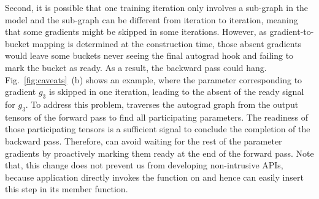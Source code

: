 Second, it is possible that one training iteration only involves a sub-graph in the model and the sub-graph can be different from iteration to iteration, meaning that some gradients might be skipped in some iterations. However, as gradient-to-bucket mapping is determined at the construction time, those absent gradients would leave some buckets never seeing the final autograd hook and failing to mark the bucket as ready. As a result, the backward pass could hang. 
Fig.~\ref{fig:caveats}~(b) shows an example, where the parameter corresponding to gradient $g_3$ is skipped in one iteration, leading to the absent of the ready signal for $g_3$.
%
To address this problem,  traverses the autograd graph from the output tensors of the forward pass to find all participating parameters. The readiness of those participating tensors is a sufficient signal to conclude the completion of the backward pass. Therefore,  can avoid waiting for the rest of the parameter gradients by proactively marking them ready at the end of the forward pass. Note that, this change does not prevent us from developing non-intrusive APIs, because application directly invokes the  function on  and hence  can easily insert this step in its member function. 

\vspace{-0.8em}

\begin{algorithm}
\footnotesize
\caption{DistributedDataParallel}\label{algo:reduction}
\end{algorithm}

